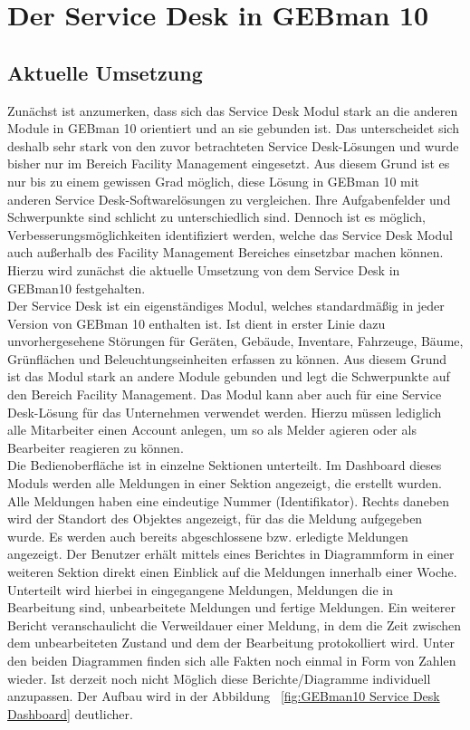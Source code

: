 
\section{Der Service Desk in GEBman 10}

\subsection{Aktuelle Umsetzung}
\noindent
Zunächst ist anzumerken, dass sich das Service Desk Modul stark an die anderen Module in GEBman 10 orientiert und an sie gebunden ist. Das unterscheidet sich deshalb sehr stark von den zuvor betrachteten Service Desk-Lösungen und wurde bisher nur im Bereich Facility Management eingesetzt. Aus diesem Grund ist es nur bis zu einem gewissen Grad möglich, diese Lösung in GEBman 10 mit anderen Service Desk-Softwarelösungen zu vergleichen. Ihre Aufgabenfelder und Schwerpunkte sind schlicht zu unterschiedlich sind. Dennoch ist es möglich, Verbesserungsmöglichkeiten identifiziert werden, welche das Service Desk Modul auch außerhalb des Facility Management Bereiches einsetzbar machen können. Hierzu wird zunächst die aktuelle Umsetzung von dem Service Desk in GEBman10 festgehalten.\\

\noindent
Der Service Desk  ist ein eigenständiges Modul, welches standardmäßig in jeder Version von GEBman 10 enthalten ist. Ist dient in erster Linie dazu unvorhergesehene Störungen für Geräten, Gebäude, Inventare, Fahrzeuge, Bäume, Grünflächen und Beleuchtungseinheiten erfassen zu können. Aus diesem Grund ist das Modul stark an andere Module gebunden und legt die Schwerpunkte auf den Bereich Facility Management. Das Modul kann aber auch für eine Service Desk-Lösung für das Unternehmen verwendet werden. Hierzu müssen lediglich alle Mitarbeiter einen Account anlegen, um so als Melder agieren oder als Bearbeiter reagieren zu können.\\

\noindent 
Die Bedienoberfläche ist in einzelne Sektionen unterteilt. Im Dashboard dieses Moduls werden alle Meldungen in einer Sektion angezeigt, die erstellt wurden. Alle Meldungen haben eine eindeutige Nummer (Identifikator). Rechts daneben wird der Standort des Objektes angezeigt, für das die Meldung aufgegeben wurde. Es werden auch bereits abgeschlossene bzw. erledigte Meldungen angezeigt. Der Benutzer erhält mittels eines Berichtes in Diagrammform in einer weiteren Sektion direkt einen Einblick auf die Meldungen innerhalb einer Woche. Unterteilt wird hierbei in eingegangene Meldungen, Meldungen die in Bearbeitung sind, unbearbeitete Meldungen und fertige Meldungen. Ein weiterer Bericht veranschaulicht die Verweildauer einer Meldung, in dem die Zeit zwischen dem unbearbeiteten Zustand und dem der Bearbeitung protokolliert wird. Unter den beiden Diagrammen finden sich alle Fakten noch einmal in Form von Zahlen wieder. Ist derzeit noch nicht Möglich diese Berichte/Diagramme individuell anzupassen. Der Aufbau wird in der Abbildung ~\ref{fig:GEBman10 Service Desk Dashboard} deutlicher. \\ 

